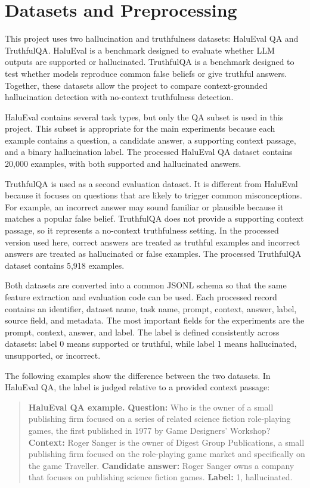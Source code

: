 \documentclass[11pt]{article}
\begin{document}
\newpage

\section{Datasets and Preprocessing}
This project uses two hallucination and truthfulness datasets: HaluEval QA and TruthfulQA. HaluEval is a benchmark designed to evaluate whether LLM outputs are supported or hallucinated. TruthfulQA is a benchmark designed to test whether models reproduce common false beliefs or give truthful answers. Together, these datasets allow the project to compare context-grounded hallucination detection with no-context truthfulness detection.

HaluEval contains several task types, but only the QA subset is used in this project. This subset is appropriate for the main experiments because each example contains a question, a candidate answer, a supporting context passage, and a binary hallucination label. The processed HaluEval QA dataset contains 20,000 examples, with both supported and hallucinated answers.

TruthfulQA is used as a second evaluation dataset. It is different from HaluEval because it focuses on questions that are likely to trigger common misconceptions. For example, an incorrect answer may sound familiar or plausible because it matches a popular false belief. TruthfulQA does not provide a supporting context passage, so it represents a no-context truthfulness setting. In the processed version used here, correct answers are treated as truthful examples and incorrect answers are treated as hallucinated or false examples. The processed TruthfulQA dataset contains 5,918 examples.

Both datasets are converted into a common JSONL schema so that the same feature extraction and evaluation code can be used. Each processed record contains an identifier, dataset name, task name, prompt, context, answer, label, source field, and metadata. The most important fields for the experiments are the prompt, context, answer, and label. The label is defined consistently across datasets: label 0 means supported or truthful, while label 1 means hallucinated, unsupported, or incorrect.

The following examples show the difference between the two datasets. In HaluEval QA, the label is judged relative to a provided context passage:

\begin{quote}
\small
\textbf{HaluEval QA example.} \textbf{Question:} Who is the owner of a small publishing firm focused on a series of related science fiction role-playing games, the first published in 1977 by Game Designers' Workshop? \textbf{Context:} Roger Sanger is the owner of Digest Group Publications, a small publishing firm focused on the role-playing game market and specifically on the game Traveller. \textbf{Candidate answer:} Roger Sanger owns a company that focuses on publishing science fiction games. \textbf{Label:} 1, hallucinated.
\end{quote}
\end{document}
